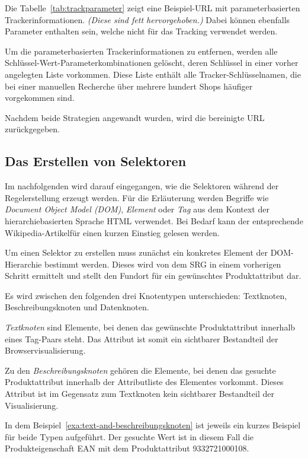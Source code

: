 Die Tabelle~\ref{tab:trackparameter} zeigt eine Beispiel-URL mit parameterbasierten Trackerinformationen.
\textit{(Diese sind fett hervorgehoben.)}
Dabei können ebenfalls Parameter enthalten sein, welche nicht für das Tracking verwendet werden.

Um die parameterbasierten Trackerinformationen zu entfernen, werden alle Schlüssel-Wert-Parameterkombinationen
gelöscht, deren Schlüssel in einer vorher angelegten Liste vorkommen.
Diese Liste enthält alle Tracker-Schlüsselnamen, die bei einer manuellen Recherche über mehrere hundert Shops
häufiger vorgekommen sind.

Nachdem beide Strategien angewandt wurden, wird die bereinigte URL zurückgegeben.

\subsection{Das Erstellen von Selektoren}
\label{subsec:erstellen-von-selektoren}

Im nachfolgenden wird darauf eingegangen, wie die Selektoren während der Regelerstellung erzeugt werden.
Für die Erläuterung werden Begriffe wie \textit{Document Object Model (DOM)}, \textit{Element} oder \textit{Tag} aus
dem Kontext der hierarchiebasierten Sprache HTML verwendet.
Bei Bedarf kann der entsprechende Wikipedia-Artikel\footnotemark für einen kurzen Einstieg gelesen werden.

Um einen Selektor zu erstellen muss zunächst ein konkretes Element der DOM-Hierarchie bestimmt werden.
Dieses wird von dem SRG in einem vorherigen Schritt ermittelt und stellt den Fundort für ein gewünschtes
Produktattribut dar.

Es wird zwischen den folgenden drei Knotentypen unterschieden: Textknoten, Beschreibungsknoten und Datenknoten.

\textit{Textknoten} sind Elemente, bei denen das gewünschte Produktattribut innerhalb eines Tag-Paars steht.
Das Attribut ist somit ein sichtbarer Bestandteil der Browservisualisierung.

Zu den \textit{Beschreibungsknoten} gehören die Elemente, bei denen das gesuchte Produktattribut innerhalb der
Attributliste des Elementes vorkommt.
Dieses Attribut ist im Gegensatz zum Textknoten kein sichtbarer Bestandteil der Visualisierung.

In dem Beispiel~\ref{exa:text-and-beschreibungsknoten} ist jeweils ein kurzes Beispiel für beide Typen aufgeführt.
Der gesuchte Wert ist in diesem Fall die Produkteigenschaft EAN mit dem Produktattribut 9332721000108.

